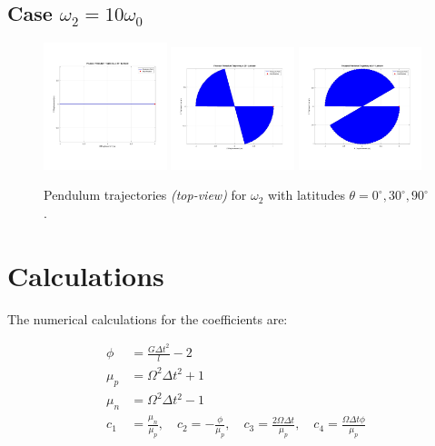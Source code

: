 \documentclass[12pt,a4paper]{article}
\begin{document}
\subsection{Case $\omega_2 = 10\omega_{0}$}
\begin{figure}[H]
    \centering
    \includegraphics[width=0.32\textwidth]{traj_dec_0.jpg}
    \includegraphics[width=0.32\textwidth]{traj_dec_30.jpg}
    \includegraphics[width=0.32\textwidth]{traj_dec_90.jpg}
    \caption{Pendulum trajectories \textit{(top-view)} for $\omega_2$ with latitudes $\theta = 0^\circ, 30^\circ, 90^\circ$.}
\end{figure}

\section{Calculations}
The numerical calculations for the coefficients are:

\[
\begin{aligned}
\phi &= \frac{G \Delta t^2}{l} - 2 \\
\mu_p &= \Omega^2 \Delta t^2 + 1 \\
\mu_n &= \Omega^2 \Delta t^2 - 1 \\
c_1 &= \frac{\mu_n}{\mu_p}, \quad
c_2 = -\frac{\phi}{\mu_p}, \quad
c_3 = \frac{2 \Omega \Delta t}{\mu_p}, \quad
c_4 = \frac{\Omega \Delta t \phi}{\mu_p}
\end{aligned}
\]
\end{document}
